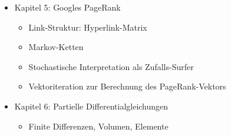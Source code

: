 \documentclass[
 a4paper,
 12pt,
 parskip=half
 ]{scrreprt}
\theoremstyle{plain}
\theoremstyle{definition}
\begin{document}
\begin{itemize}
\item Kapitel 5: Googles PageRank
  \begin{itemize}
  \item Link-Struktur: Hyperlink-Matrix
  \item Markov-Ketten
  \item Stochastische Interpretation als Zufalls-Surfer
  \item Vektoriteration zur Berechnung des PageRank-Vektors
  \end{itemize}
\item Kapitel 6: Partielle Differentialgleichungen
  \begin{itemize}
  \item Finite Differenzen, Volumen, Elemente
  \end{itemize}
\end{itemize}
\end{document}
